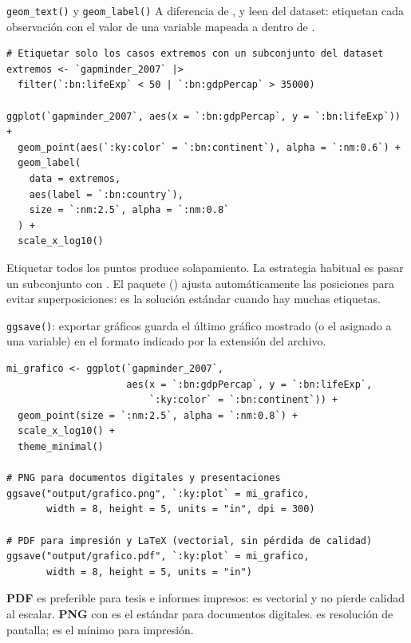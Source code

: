\documentclass[8pt]{beamer}
\begin{document}
	\begin{frame}[fragile]{\texttt{geom\_text()} y \texttt{geom\_label()}}
		A diferencia de ,  y  leen del dataset: etiquetan cada observación con el valor de una variable mapeada a  dentro de .

\begin{lstlisting}[style=RScript]
# Etiquetar solo los casos extremos con un subconjunto del dataset
extremos <- `gapminder_2007` |>
  filter(`:bn:lifeExp` < 50 | `:bn:gdpPercap` > 35000)

ggplot(`gapminder_2007`, aes(x = `:bn:gdpPercap`, y = `:bn:lifeExp`)) +
  geom_point(aes(`:ky:color` = `:bn:continent`), alpha = `:nm:0.6`) +
  geom_label(
    data = extremos,
    aes(label = `:bn:country`),
    size = `:nm:2.5`, alpha = `:nm:0.8`
  ) +
  scale_x_log10()
\end{lstlisting}

		\begin{exampleblock}{}
			Etiquetar todos los puntos produce solapamiento. La estrategia habitual es pasar un subconjunto con . El paquete  () ajusta automáticamente las posiciones para evitar superposiciones: es la solución estándar cuando hay muchas etiquetas.
		\end{exampleblock}
	\end{frame}


	\begin{frame}[fragile]{\texttt{ggsave()}: exportar gráficos}
		 guarda el último gráfico mostrado (o el asignado a una variable) en el formato indicado por la extensión del archivo.

\begin{lstlisting}[style=RScript]
mi_grafico <- ggplot(`gapminder_2007`,
                     aes(x = `:bn:gdpPercap`, y = `:bn:lifeExp`,
                         `:ky:color` = `:bn:continent`)) +
  geom_point(size = `:nm:2.5`, alpha = `:nm:0.8`) +
  scale_x_log10() +
  theme_minimal()

# PNG para documentos digitales y presentaciones
ggsave("output/grafico.png", `:ky:plot` = mi_grafico,
       width = 8, height = 5, units = "in", dpi = 300)

# PDF para impresión y LaTeX (vectorial, sin pérdida de calidad)
ggsave("output/grafico.pdf", `:ky:plot` = mi_grafico,
       width = 8, height = 5, units = "in")
\end{lstlisting}

		\begin{block}{}
			\textbf{PDF} es preferible para tesis e informes impresos: es vectorial y no pierde calidad al escalar. \textbf{PNG} con  es el estándar para documentos digitales.  es resolución de pantalla;  es el mínimo para impresión.
		\end{block}
	\end{frame}
\end{document}
